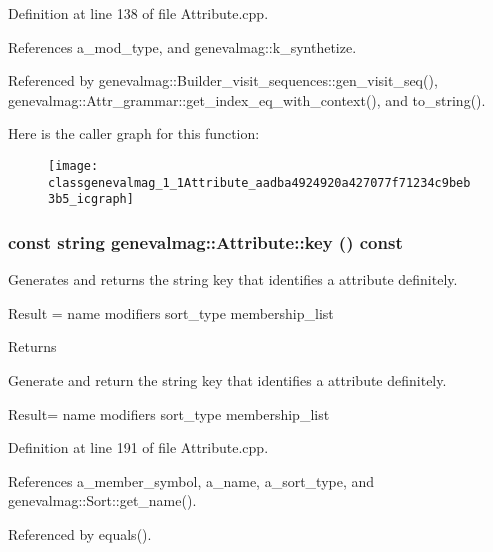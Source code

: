 Definition at line 138 of file Attribute.cpp.



References a\_\-mod\_\-type, and genevalmag::k\_\-synthetize.



Referenced by genevalmag::Builder\_\-visit\_\-sequences::gen\_\-visit\_\-seq(), genevalmag::Attr\_\-grammar::get\_\-index\_\-eq\_\-with\_\-context(), and to\_\-string().



Here is the caller graph for this function:\nopagebreak
\begin{figure}[H]
\begin{center}
\leavevmode
\texttt{[image: classgenevalmag\_1\_1Attribute\_aadba4924920a427077f71234c9beb3b5\_icgraph]}
\end{center}
\end{figure}


\hypertarget{classgenevalmag_1_1Attribute_a6692cef1261bf52199e8fbc81c15f010}{
\subsubsection[{key}]{\setlength{\rightskip}{0pt plus 5cm}const string genevalmag::Attribute::key () const}}
\label{classgenevalmag_1_1Attribute_a6692cef1261bf52199e8fbc81c15f010}
Generates and returns the string key that identifies a attribute definitely.\par
 \par
 Result = name modifiers sort\_\-type membership\_\-list\par


\begin{DoxyReturn}{Returns}

\end{DoxyReturn}
Generate and return the string key that identifies a attribute definitely.

Result= name modifiers sort\_\-type membership\_\-list 

Definition at line 191 of file Attribute.cpp.



References a\_\-member\_\-symbol, a\_\-name, a\_\-sort\_\-type, and genevalmag::Sort::get\_\-name().



Referenced by equals().



